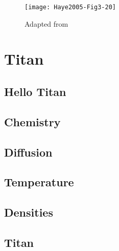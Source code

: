 \documentclass{report}
\begin{document}
\tableofcontents

\begin{figure}
\centering
\texttt{[image: Haye2005-Fig3-20]}
\caption{Adapted from \cite{Haye2005}}
\end{figure}

\part{Titan}
\chapter{Hello Titan}


\chapter{Chemistry}


\chapter{Diffusion}


\chapter{Temperature}


\chapter{Densities}


\appendix
\chapter{Titan}

\clearpage


\end{document}
